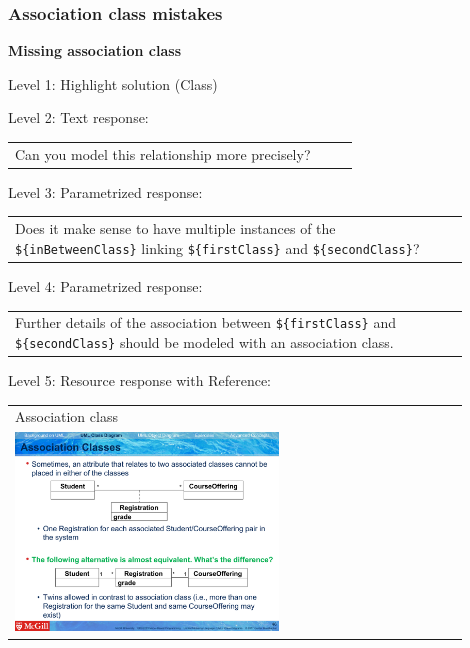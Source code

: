 \subsubsection{Association class mistakes}

\noindent \textbf{Missing association class} \medskip

\noindent Level 1: Highlight solution (Class) \medskip

\noindent Level 2: Text response: \medskip

\begin{tabular}{|p{0.9\linewidth}}
Can you model this relationship more precisely?
\end{tabular} \medskip

\noindent Level 3: Parametrized response: \medskip

\begin{tabular}{|p{0.9\linewidth}}
Does it make sense to have multiple instances of the \verb|${inBetweenClass}| linking \verb|${firstClass}| and \verb|${secondClass}|?
\end{tabular} \medskip

\noindent Level 4: Parametrized response: \medskip

\begin{tabular}{|p{0.9\linewidth}}
Further details of the association between \verb|${firstClass}| and \verb|${secondClass}| should be modeled with an association class.
\end{tabular} \medskip

\noindent Level 5: Resource response with Reference: \medskip

\begin{tabular}{|p{0.9\linewidth}}
Association class

\\
\includegraphics[width=0.6\textwidth]{images/association_class.png}
\end{tabular} \medskip


